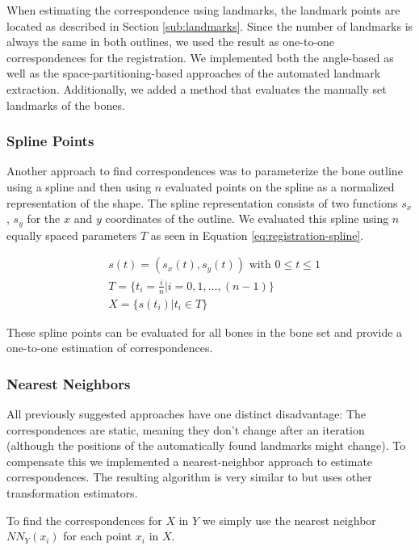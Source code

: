 \documentclass[pdftex,12pt,a4paper]{report}
\begin{document}
When estimating the correspondence using landmarks, the landmark points are located as described in Section
\ref{sub:landmarks}. Since the number of landmarks is always the same in both outlines, we used the result
as one-to-one correspondences for the registration. We implemented both the angle-based as well as the
space-partitioning-based approaches of the automated landmark extraction. Additionally, we added a method
that evaluates the manually set landmarks of the bones.

\subsubsection{Spline Points}

Another approach to find correspondences was to parameterize the bone outline using a spline and then using $n$
evaluated points on the spline as a normalized representation of the shape. The spline representation consists
of two functions $s_x$, $s_y$ for the $x$ and $y$ coordinates of the outline. We evaluated this spline using $n$
equally spaced parameters $T$ as seen in Equation \ref{eq:registration-spline}.

\begin{equation}
\label{eq:registration-spline}
\begin{split}
& s(t) = ( s_x(t), s_y(t) ) \text{ with } 0 \leq t \leq 1 \\
& T = \{ t_i=\frac{i}{n} | i=0, 1, \dots, (n-1) \} \\
& X = \{ s(t_i) | t_i \in T \}
\end{split}
\end{equation}

These spline points can be evaluated for all bones in the bone set and provide a one-to-one estimation of correspondences.

\subsubsection{Nearest Neighbors}

All previously suggested approaches have one distinct disadvantage: The correspondences are static, meaning they don't
change after an iteration (although the positions of the automatically found landmarks might change). To compensate this
we implemented a nearest-neighbor approach to estimate correspondences. The resulting algorithm is very similar to
\cite{besl1992method} but uses other transformation estimators.

To find the correspondences for $X$ in $Y$ we simply use the nearest neighbor $NN_Y(x_i)$ for each point $x_i$ in $X$.
\end{document}
